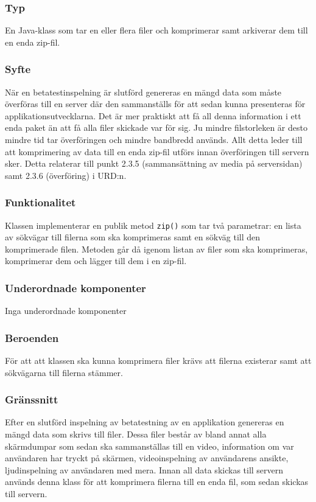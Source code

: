 \subsubsection{Typ}
En Java-klass som tar en eller flera filer och komprimerar samt arkiverar dem till en enda zip-fil. 

\subsubsection{Syfte}
När en betatestinspelning är slutförd genereras en mängd data som måste överföras till en server där den sammanställs för att sedan kunna presenteras för applikationsutvecklarna. Det är mer praktiskt att få all denna information i ett enda paket än att få alla filer skickade var för sig. Ju mindre filstorleken är desto mindre tid tar överföringen och mindre bandbredd används. Allt detta leder till att komprimering av data till en enda zip-fil utförs innan överföringen till servern sker. Detta relaterar till punkt 2.3.5 (sammansättning av media på serversidan) samt 2.3.6 (överföring) i URD:n. 

\subsubsection{Funktionalitet}
Klassen implementerar en publik metod \verb:zip(): som tar två parametrar: en lista av sökvägar till filerna som ska komprimeras samt en sökväg till den komprimerade filen. Metoden går då igenom listan av filer som ska komprimeras, komprimerar dem och lägger till dem i en zip-fil. 

\subsubsection{Underordnade komponenter}
Inga underordnade komponenter

\subsubsection{Beroenden}
För att att klassen ska kunna komprimera filer krävs att filerna existerar samt att sökvägarna till filerna stämmer. 

\subsubsection{Gränssnitt}
Efter en slutförd inspelning av betatestning av en applikation genereras en mängd data som skrivs till filer. Dessa filer består av bland annat alla skärmdumpar som sedan ska sammanställas till en video, information om var användaren har tryckt på skärmen, videoinspelning av användarens ansikte, ljudinspelning av användaren med mera. Innan all data skickas till servern används denna klass för att komprimera filerna till en enda fil, som sedan skickas till servern. 

